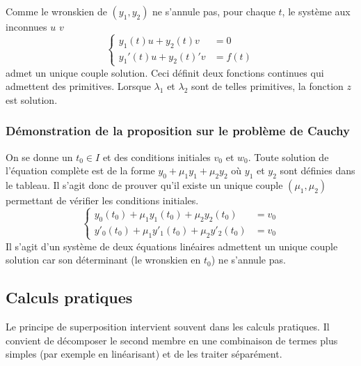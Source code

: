 \begin{demo}
\begin{enumerate}
Comme le wronskien de $(y_1,y_2)$ ne s'annule pas, pour chaque $t$, le système aux inconnues $u$ $v$ 
\begin{displaymath}
 \left\lbrace 
\begin{aligned}
 y_1(t)u +  y_2(t) v &= 0 \\
 y_1'(t)u + y_2(t)'v &= f(t)
\end{aligned}
\right. 
\end{displaymath}
admet un unique couple solution. Ceci définit deux fonctions continues qui admettent des primitives. Lorsque $\lambda_1$ et $\lambda_2$ sont de telles primitives, la fonction $z$ est solution.
 \end{enumerate}
\end{demo}

\subsubsection{Démonstration de la proposition sur le problème de Cauchy}
\begin{demo}
On se donne un $t_0\in I$ et des conditions initiales $v_0$ et $w_0$. Toute solution de l'équation complète est de la forme $y_0 + \mu_1 y_1 +\mu_2 y_2$ où $y_1$ et $y_2$ sont définies dans le tableau. Il s'agit donc de prouver qu'il existe un unique couple $(\mu_1,\mu_2)$ permettant de vérifier les conditions initiales.
\begin{displaymath}
 \left\lbrace 
\begin{aligned}
 y_0(t_0) + \mu_1y_1(t_0) + \mu_2y_2(t_0) &= v_0 \\
 y'_0(t_0) + \mu_1y'_1(t_0) + \mu_2y'_2(t_0) &= v_0 
\end{aligned}
\right. 
\end{displaymath}
Il s'agit d'un système de deux équations linéaires admettent un unique couple solution car son déterminant (le wronskien en $t_0$) ne s'annule pas.
 \end{demo}


\subsection{Calculs pratiques}
Le principe de superposition intervient souvent dans les calculs pratiques. Il convient de décomposer le second membre en une combinaison de termes plus simples (par exemple en linéarisant) et de les traiter séparément.

